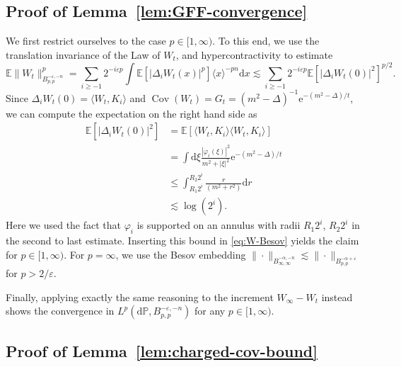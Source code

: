 \documentclass[11pt, a4paper]{scrartcl}
\numberwithin{equation}{section}
\theoremstyle{plain}
\theoremstyle{remark}
\newcommand{\mathd}{\mathrm{d}}
\newcommand{\mathe}{\mathrm{e}}
\newcommand{\tmop}[1]{\ensuremath{\operatorname{#1}}}
\begin{document}
\subsection{Proof of
Lemma~\ref{lem:GFF-convergence}}\label{app:GFF-convergence}

We first restrict ourselves to the case $p \in [1, \infty)$. To this end, we
use the translation invariance of the Law of $W_t$, and hypercontractivity to
estimate
\begin{equation}
  \mathbb{E} \| W_t \|_{B^{- \varepsilon, - n}_{p, p}}^p = \sum_{i \geqslant -
  1} 2^{- i \varepsilon p} \int \mathbb{E} [| \Delta_i W_t (x) |^p] \langle x
  \rangle^{- pn} \mathd x \lesssim \sum_{i \geqslant - 1} 2^{- i \varepsilon
  p} \mathbb{E} [| \Delta_i W_t (0) |^2]^{p / 2} . \label{eq:W-Besov}
\end{equation}
Since $\Delta_i W_t (0) = \langle W_t, K_i \rangle$ and $\tmop{Cov} (W_t) =
G_t = (m^2 - \Delta)^{- 1} \mathe^{- (m^2 - \Delta) / t}$, we can compute the
expectation on the right hand side as
\[ \begin{aligned}
     \mathbb{E} [| \Delta_i W_t (0) |^2] &= \mathbb{E} [\langle W_t, K_i
     \rangle \langle W_t, K_i \rangle]\\
     &= \int \mathd \xi \frac{| \varphi_i (\xi) |^2}{m^2 + | \xi |^2}
     \mathe^{- (m^2 - \Delta) / t}\\
     &\leqslant  \int_{R_1  2^i}^{R_2 2^i} \frac{r}{(m^2 + r^2)} \mathd r\\
     & \lesssim  \log (2^i) .
   \end{aligned} \]
Here we used the fact that $\varphi_i$ is supported on an annulus with radii
$R_1 2^i$, $R_2 2^i$ in the second to last estimate. Inserting this bound in
\eqref{eq:W-Besov} yields the claim for $p \in [1, \infty) $. For $p =
\infty$, we use the Besov embedding $\| \cdot \|_{B^{- \alpha, - n}_{\infty,
\infty}} \lesssim \| \cdot \|_{B^{- \alpha + \varepsilon}_{p, p}}$ for $p > 2
/ \varepsilon$.

Finally, applying exactly the same reasoning to the increment $W_{\infty} -
W_t$ instead shows the convergence in $L^p (\mathd \mathbb{P}, B^{- \varepsilon, -
n}_{p, p})$ for any $p \in [1, \infty)$.

\subsection{Proof of
Lemma~\ref{lem:charged-cov-bound}}\label{app:charged-cov-bound}
\end{document}
